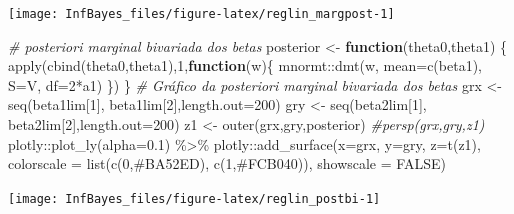 \documentclass[
]{book}
\newenvironment{Shaded}{\begin{snugshade}}{\end{snugshade}}
\newcommand{\AttributeTok}[1]{\textcolor[rgb]{0.77,0.63,0.00}{#1}}
\newcommand{\CommentTok}[1]{\textcolor[rgb]{0.56,0.35,0.01}{\textit{#1}}}
\newcommand{\ConstantTok}[1]{\textcolor[rgb]{0.00,0.00,0.00}{#1}}
\newcommand{\ControlFlowTok}[1]{\textcolor[rgb]{0.13,0.29,0.53}{\textbf{#1}}}
\newcommand{\DecValTok}[1]{\textcolor[rgb]{0.00,0.00,0.81}{#1}}
\newcommand{\FloatTok}[1]{\textcolor[rgb]{0.00,0.00,0.81}{#1}}
\newcommand{\FunctionTok}[1]{\textcolor[rgb]{0.00,0.00,0.00}{#1}}
\newcommand{\NormalTok}[1]{#1}
\newcommand{\OtherTok}[1]{\textcolor[rgb]{0.56,0.35,0.01}{#1}}
\newcommand{\SpecialCharTok}[1]{\textcolor[rgb]{0.00,0.00,0.00}{#1}}
\newcommand{\StringTok}[1]{\textcolor[rgb]{0.31,0.60,0.02}{#1}}
\begin{document}
\begin{center}\texttt{[image: InfBayes\_files/figure-latex/reglin\_margpost-1]} \end{center}

\begin{Shaded}
\begin{Highlighting}[]
\CommentTok{\# posteriori marginal bivariada dos betas}
\NormalTok{posterior }\OtherTok{\textless{}{-}} \ControlFlowTok{function}\NormalTok{(theta0,theta1) \{ }\FunctionTok{apply}\NormalTok{(}\FunctionTok{cbind}\NormalTok{(theta0,theta1),}\DecValTok{1}\NormalTok{,}\ControlFlowTok{function}\NormalTok{(w)\{ mnormt}\SpecialCharTok{::}\FunctionTok{dmt}\NormalTok{(w, }\AttributeTok{mean=}\FunctionTok{c}\NormalTok{(beta1), }\AttributeTok{S=}\NormalTok{V, }\AttributeTok{df=}\DecValTok{2}\SpecialCharTok{*}\NormalTok{a1)  \}) \}}
\CommentTok{\# Gráfico da posteriori marginal bivariada dos betas}
\NormalTok{grx }\OtherTok{\textless{}{-}} \FunctionTok{seq}\NormalTok{(beta1lim[}\DecValTok{1}\NormalTok{], beta1lim[}\DecValTok{2}\NormalTok{],}\AttributeTok{length.out=}\DecValTok{200}\NormalTok{)}
\NormalTok{gry }\OtherTok{\textless{}{-}} \FunctionTok{seq}\NormalTok{(beta2lim[}\DecValTok{1}\NormalTok{], beta2lim[}\DecValTok{2}\NormalTok{],}\AttributeTok{length.out=}\DecValTok{200}\NormalTok{)}
\NormalTok{z1 }\OtherTok{\textless{}{-}} \FunctionTok{outer}\NormalTok{(grx,gry,posterior)}
\CommentTok{\#persp(grx,gry,z1)}
\NormalTok{plotly}\SpecialCharTok{::}\FunctionTok{plot\_ly}\NormalTok{(}\AttributeTok{alpha=}\FloatTok{0.1}\NormalTok{) }\SpecialCharTok{\%\textgreater{}\%}
\NormalTok{  plotly}\SpecialCharTok{::}\FunctionTok{add\_surface}\NormalTok{(}\AttributeTok{x=}\NormalTok{grx, }\AttributeTok{y=}\NormalTok{gry, }\AttributeTok{z=}\FunctionTok{t}\NormalTok{(z1), }\AttributeTok{colorscale =} \FunctionTok{list}\NormalTok{(}\FunctionTok{c}\NormalTok{(}\DecValTok{0}\NormalTok{,}\StringTok{\textquotesingle{}\#BA52ED\textquotesingle{}}\NormalTok{), }\FunctionTok{c}\NormalTok{(}\DecValTok{1}\NormalTok{,}\StringTok{\textquotesingle{}\#FCB040\textquotesingle{}}\NormalTok{)), }\AttributeTok{showscale =} \ConstantTok{FALSE}\NormalTok{)}
\end{Highlighting}
\end{Shaded}

\begin{center}\texttt{[image: InfBayes\_files/figure-latex/reglin\_postbi-1]} \end{center}
\end{document}
